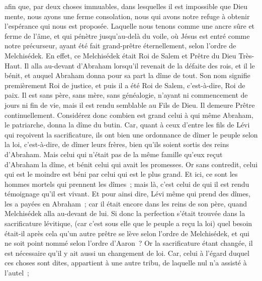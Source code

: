 \begin{multicols}{2}
afin que, par deux choses immuables, dans lesquelles il est impossible que Dieu mente, nous ayons une ferme consolation, nous qui avons notre refuge à obtenir l'espérance qui nous est proposée.
Laquelle nous tenons comme une ancre sûre et ferme de l'âme, et qui pénètre jusqu'au-delà du voile,
où Jésus est entré comme notre précurseur, ayant été fait grand-prêtre éternellement, selon l'ordre de Melchisédek.
\VerseOne{}En effet, ce Melchisédek était Roi de Salem et Prêtre du Dieu Très-Haut. Il alla au-devant d'Abraham lorsqu'il revenait de la défaite des rois, et il le bénit,
et auquel Abraham donna pour sa part la dîme de tout. Son nom signifie premièrement Roi de justice, et puis il a été Roi de Salem, c'est-à-dire, Roi de paix.
Il est sans père, sans mère, sans généalogie, n'ayant ni commencement de jours ni fin de vie, mais il est rendu semblable au Fils de Dieu. Il demeure Prêtre continuellement.
Considérez donc combien est grand celui à qui même Abraham, le patriarche, donna la dîme du butin.
Car, quant à ceux d'entre les fils de Lévi qui reçoivent la sacrificature, ils ont bien une ordonnance de dîmer le peuple selon la loi, c'est-à-dire, de dîmer leurs frères, bien qu'ils soient sortis des reins d'Abraham.
Mais celui qui n'était pas de la même famille qu'eux reçut d'Abraham la dîme, et bénit celui qui avait les promesses.
Or sans contredit, celui qui est le moindre est béni par celui qui est le plus grand.
Et ici, ce sont les hommes mortels qui prennent les dîmes~; mais là, c'est celui de qui il est rendu témoignage qu'il est vivant.
Et pour ainsi dire, Lévi même qui prend des dîmes, les a payées en Abraham~;
car il était encore dans les reins de son père, quand Melchisédek alla au-devant de lui.
Si donc la perfection s'était trouvée dans la sacrificature lévitique, (car c'est sous elle que le peuple a reçu la loi) quel besoin était-il après cela qu'un autre prêtre se lève selon l'ordre de Melchisédek, et qui ne soit point nommé selon l'ordre d'Aaron~?
Or la sacrificature étant changée, il est nécessaire qu'il y ait aussi un changement de loi.
Car, celui à l'égard duquel ces choses sont dites, appartient à une autre tribu, de laquelle nul n'a assisté à l'autel~;

\end{multicols}
